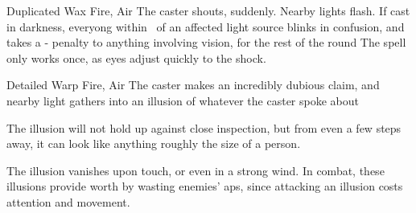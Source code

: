 \ifodd\value{diceNo}

  {Duplicated}%
  {Wax}%
  {Fire, Air}%
  {}%
  {The caster shouts, suddenly.
  Nearby lights flash.
  If cast in darkness, everyong within \spellRange\ of an affected light source blinks in confusion, and takes a - penalty to anything involving vision, for the rest of the round}%
  {The spell only works once, as eyes adjust quickly to the shock.}

\else

  {Detailed}%
  {Warp}%
  {Fire, Air}%
  {}%
  {The caster makes an incredibly dubious claim, and nearby light gathers into an illusion of whatever the caster spoke about}%
  {The illusion will not hold up against close inspection, but from even a few steps away, it can look like anything roughly the size of a person.

  The illusion vanishes upon touch, or even in a strong wind.
  In combat, these illusions provide worth by wasting enemies' \glspl{ap}, since attacking an illusion costs attention and movement.}

\fi

